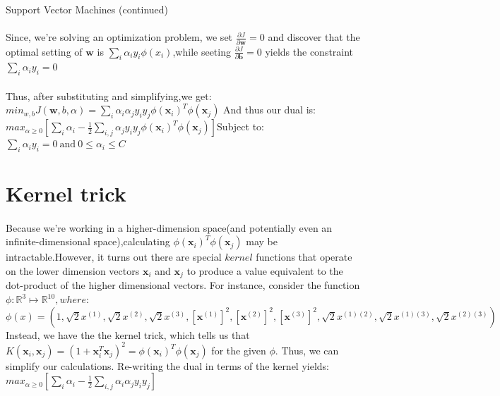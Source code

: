 \documentclass[a4paper]{article}
\begin{document}
 \begin{algorithm}
  \ContinuedFloat
  \caption{Support Vector Machines (continued)}
  \begin{algorithmic}
      \State
 \paragraph{}
Since, we're solving an optimization problem, we set $\frac{\partial  J}{\partial \textbf{w}} = 0 $ and discover that the optimal setting of $\textbf{w}$ is $\sum_{i}\alpha_{i}y_{i}\phi(x_{i}) $,while seeting $\frac{\partial  J}{\partial \textbf{b}} = 0 $ yields the constraint $\sum_{i}\alpha_{i}y_{i} = 0$
      
\paragraph{}
Thus, after substituting and simplifying,we get: \newline
$min_{w,b}J(\textbf{w},b,\alpha) = \sum_{i}\alpha_{i}\alpha_{j}y_{i}y_{j}\phi(\textbf{x}_{i})^T \phi(\textbf{x}_{j}) $
And thus our dual is: \newline
$max_{\alpha \geq 0}[\sum_{i}\alpha_{i} - \frac{1}{2} \sum_{i,j}\alpha_{j}y_{i}y_{j}\phi(\textbf{x}_{i})^T \phi(\textbf{x}_{j})]$\newline Subject to: $\sum_{i}\alpha_{i}y_{i} = 0  \ \text{and} \ 0 \leq \alpha_{i} \leq C$   
      
      
\section{Kernel trick}
\paragraph{}

Because we're working in a higher-dimension space(and potentially even an infinite-dimensional space),calculating $\phi(\textbf{x}_{i})^T \phi(\textbf{x}_{j})$ may be intractable.However, it turns out there are special $kernel$ functions that operate on the lower dimension vectors $\textbf{x}_{i}$ and $\textbf{x}_{j}$ to produce a value equivalent to the dot-product of the higher dimensional vectors.
For instance, consider the function $\phi \mathpunct{:} \mathbb{R}^3 \longmapsto \mathbb{R}^{10} ,where: $
$\phi(x) = (1,\sqrt{2}x^{(1)} ,\sqrt{2}x^{(2)}, \sqrt{2}x^{(3)} ,[\textbf{x}^{(1)}]^2 ,[\textbf{x}^{(2)}]^2, [\textbf{x}^{(3)}]^2, \sqrt{2}x^{(1)(2)} ,\sqrt{2}x^{(1)(3)} ,\sqrt{2}x^{(2)(3)} )  $
Instead, we have the the kernel trick, which tells us that $K(\textbf{x}_{i},\textbf{x}_{j} ) = (1+\textbf{x}_{i}^T\textbf{x}_{j})^2 = \phi(\textbf{x}_{i})^T\phi(\textbf{x}_{j})$ for the given $\phi$. Thus, we can simplify our calculations.
Re-writing the dual in terms of the kernel yields:
$max_{\alpha \geq 0}[\sum_{i}\alpha_{i} - \frac{1}{2}\sum_{i,j}\alpha_{i}\alpha_{j}y_{i}y_{j}]$



\end{algorithmic}
\end{algorithm}
\end{document}
